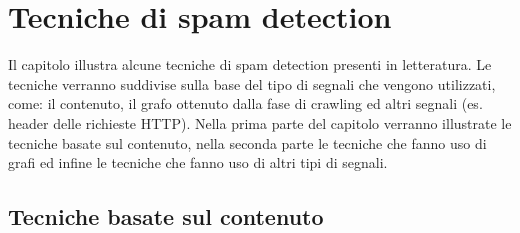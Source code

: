 \chapter{Tecniche di spam detection}

Il capitolo illustra alcune tecniche di spam detection presenti in letteratura. Le tecniche verranno suddivise sulla base del tipo di segnali che vengono utilizzati, come: il contenuto, il grafo ottenuto dalla fase di crawling ed altri segnali (es. header delle richieste HTTP). Nella prima parte del capitolo verranno illustrate le tecniche basate sul contenuto, nella seconda parte le tecniche che fanno uso di grafi ed infine le tecniche che fanno uso di altri tipi di segnali.

\section{Tecniche basate sul contenuto}
